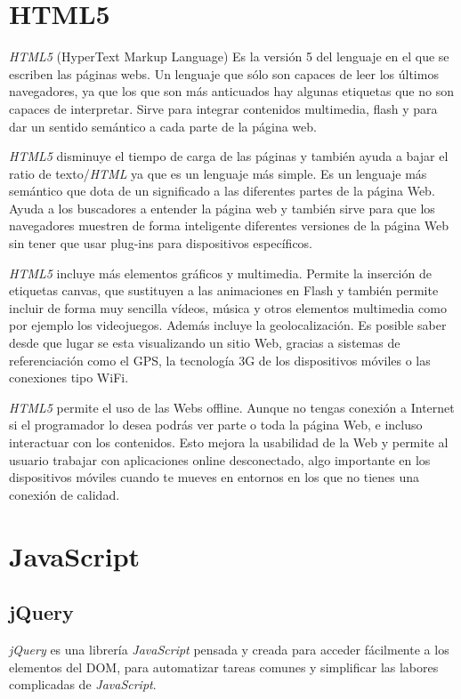 \documentclass[a4paper, 12pt]{book}
\begin{document}
\section{HTML5}
\label{sec:html5}
\textit{HTML5} (HyperText Markup Language) Es la versi\'on 5 del lenguaje en el que se escriben las p\'aginas webs. Un lenguaje que s\'olo son capaces 
de leer los \'ultimos navegadores, ya que los que son m\'as anticuados hay algunas etiquetas que no son capaces de interpretar. Sirve para integrar 
contenidos multimedia, flash y para dar un sentido sem\'antico a cada parte de la p\'agina web.

\textit{HTML5} disminuye el tiempo de carga de las p\'aginas y tambi\'en ayuda a bajar el ratio de texto/\textit{HTML} ya que es un lenguaje m\'as simple.
Es un lenguaje m\'as sem\'antico que dota de un significado a las diferentes partes de la p\'agina Web. Ayuda a los buscadores a entender la p\'agina 
web y tambi\'en sirve para que los navegadores muestren de forma inteligente diferentes versiones de la p\'agina Web sin tener que usar plug-ins para 
dispositivos espec\'ificos.

\textit{HTML5} incluye m\'as elementos gr\'aficos y multimedia. Permite la inserci\'on de etiquetas canvas, que sustituyen a las animaciones en Flash y tambi\'en 
permite incluir de forma muy sencilla v\'ideos, m\'usica y otros elementos multimedia como por ejemplo los videojuegos. Adem\'as incluye la 
geolocalizaci\'on. Es posible saber desde que lugar se esta visualizando un sitio Web, gracias a sistemas de referenciaci\'on como el GPS, 
la tecnolog\'ia 3G de los dispositivos m\'oviles o las conexiones tipo WiFi.

\textit{HTML5} permite el uso de las Webs offline. Aunque no tengas conexi\'on a Internet si el programador lo desea podr\'as ver parte o toda la p\'agina Web, 
e incluso interactuar con los contenidos. Esto mejora la usabilidad de la Web y permite al usuario trabajar con aplicaciones online desconectado, 
algo importante en los dispositivos m\'oviles cuando te mueves en entornos en los que no tienes una conexi\'on de calidad.


\section{JavaScript}
\label{sec:javascript}


\subsection{jQuery}
\label{subsec:jquery}
\textit{jQuery} es una librer\'ia \textit{JavaScript} pensada y creada para acceder f\'acilmente a los elementos del DOM, para automatizar tareas comunes 
y simplificar las labores complicadas de \textit{JavaScript}.
\end{document}
